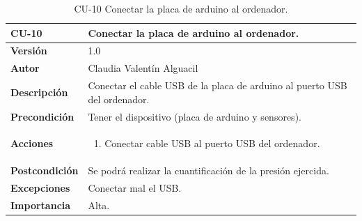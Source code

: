 \begin{table}[p]
	\centering
	\begin{tabularx}{\linewidth}{ p{} p{} }
		\toprule
		\textbf{CU-10}    & \textbf{Conectar la placa de arduino al ordenador.}\\
		\toprule
		\textbf{Versión}              & 1.0    \\
		\textbf{Autor}                & Claudia Valentín Alguacil \\
		 
		\textbf{Descripción}          & Conectar el cable USB de la placa de arduino al puerto USB del ordenador. \\
		\textbf{Precondición} & Tener el dispositivo (placa de arduino y sensores).\\
		\textbf{Acciones}             &
		\begin{enumerate}
			\def\labelenumi{\arabic{enumi}.}
			\tightlist
			\item Conectar cable USB al puerto USB del ordenador.
		\end{enumerate}\\
		\textbf{Postcondición}        &  Se podrá realizar la cuantificación de la presión ejercida. \\
		\textbf{Excepciones}          & Conectar mal el USB. \\
		\textbf{Importancia}          & Alta. \\
		\bottomrule
	\end{tabularx}
	\caption{CU-10 Conectar la placa de arduino al ordenador.}
\end{table}

